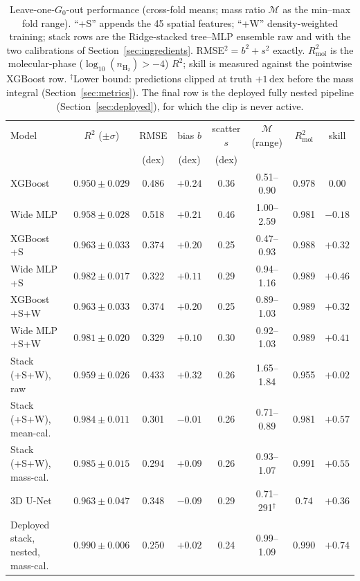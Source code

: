 \documentclass[fleqn,usenatbib]{rasti}
\newcommand{\logn}{\log_{10}(n_{\mathrm{H_2}})}
\newcommand{\Gzero}{G_0}
\newcommand{\dex}{\,\text{dex}}
\newcommand{\Rsq}{R^2}
\newcommand{\Mratio}{\mathcal{M}}
\begin{document}
\begin{table}
\centering
\caption{Leave-one-\(\Gzero\)-out performance (cross-fold means; mass
ratio \(\Mratio\) as the min--max fold range). ``+S'' appends the 45
spatial features; ``+W'' density-weighted training; stack rows are the
Ridge-stacked tree--MLP ensemble raw and with the two calibrations of
Section~\ref{sec:ingredients}. RMSE\(^2 = b^2 + s^2\) exactly.
\(\Rsq_{\mathrm{mol}}\) is the molecular-phase (\(\logn > -4\)) \(\Rsq\);
skill is measured against the pointwise XGBoost row. \(^\dagger\)Lower
bound: predictions clipped at truth \(+1\dex\) before the mass integral
(Section~\ref{sec:metrics}). The final row is the deployed fully nested
pipeline (Section~\ref{sec:deployed}), for which the clip is never
active.}
\label{tab:main}
\begin{tabular}{lccccccc}
\hline
Model & \(\Rsq\) (\(\pm\sigma\)) & RMSE & bias \(b\) & scatter \(s\) &
  \(\Mratio\) (range) & \(\Rsq_{\mathrm{mol}}\) & skill \\
 & & (dex) & (dex) & (dex) & & & \\
\hline
XGBoost                  & \(0.950 \pm 0.029\) & 0.486 & \(+0.24\) & 0.36 & 0.51--0.90 & 0.978 & \(0.00\) \\
Wide MLP                 & \(0.958 \pm 0.028\) & 0.518 & \(+0.21\) & 0.46 & 1.00--2.59 & 0.981 & \(-0.18\) \\
XGBoost +S               & \(0.963 \pm 0.033\) & 0.374 & \(+0.20\) & 0.25 & 0.47--0.93 & 0.988 & \(+0.32\) \\
Wide MLP +S              & \(0.982 \pm 0.017\) & 0.322 & \(+0.11\) & 0.29 & 0.94--1.16 & 0.989 & \(+0.46\) \\
XGBoost +S+W             & \(0.963 \pm 0.033\) & 0.374 & \(+0.20\) & 0.25 & 0.89--1.03 & 0.989 & \(+0.32\) \\
Wide MLP +S+W            & \(0.981 \pm 0.020\) & 0.329 & \(+0.10\) & 0.30 & 0.92--1.03 & 0.989 & \(+0.41\) \\
Stack (+S+W), raw        & \(0.959 \pm 0.026\) & 0.433 & \(+0.32\) & 0.26 & 1.65--1.84 & 0.955 & \(+0.02\) \\
Stack (+S+W), mean-cal.  & \(0.984 \pm 0.011\) & 0.301 & \(-0.01\) & 0.26 & 0.71--0.89 & 0.981 & \(+0.57\) \\
Stack (+S+W), mass-cal.  & \(0.985 \pm 0.015\) & 0.294 & \(+0.09\) & 0.26 & 0.93--1.07 & 0.991 & \(+0.55\) \\
3D U-Net                 & \(0.963 \pm 0.047\) & 0.348 & \(-0.09\) & 0.29 & 0.71--291\(^\dagger\) & 0.74 & \(+0.36\) \\
\hline
Deployed stack, nested, mass-cal. & \(0.990 \pm 0.006\) & 0.250 & \(+0.02\) & 0.24 & 0.99--1.09 & 0.990 & \(+0.74\) \\
\hline
\end{tabular}
\end{table}
\end{document}
